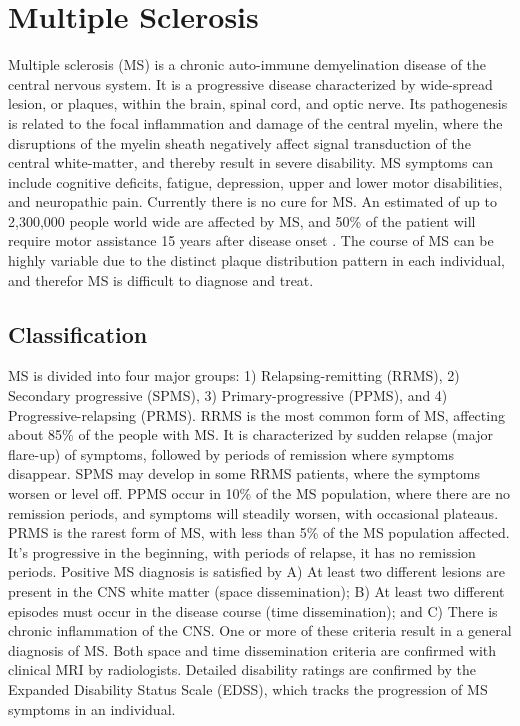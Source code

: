 \section{Multiple Sclerosis}

Multiple sclerosis (MS) is a chronic auto-immune demyelination disease of the central nervous system. It is a progressive disease characterized by wide-spread lesion, or plaques, within the brain, spinal cord, and optic nerve. Its pathogenesis is related to the focal inflammation and damage of the central myelin, where the disruptions of the myelin sheath negatively affect signal transduction of the central white-matter, and thereby result in severe disability. MS symptoms can include cognitive deficits, fatigue, depression, upper and lower motor disabilities, and neuropathic pain. Currently there is no cure for MS. 
An estimated of up to 2,300,000 people world wide are affected by MS, and 50\% of the patient will require motor assistance 15 years after disease onset \cite{Goldenberg2012}. The course of MS can be highly variable due to the distinct plaque distribution pattern in each individual, and therefor MS is difficult to diagnose and treat. 

\subsection{Classification}

MS is divided into four major groups: 1) Relapsing-remitting (RRMS), 2) Secondary progressive (SPMS), 3) Primary-progressive (PPMS), and 4) Progressive-relapsing (PRMS). RRMS is the most common form of MS, affecting about 85\% of the people with MS. It is characterized by sudden relapse (major flare-up) of symptoms, followed by periods of remission where symptoms disappear. SPMS may develop in some RRMS patients, where the symptoms worsen or level off. PPMS occur in 10\% of the MS population, where there are no remission periods, and symptoms will steadily worsen, with occasional plateaus. PRMS is the rarest form of MS, with less than 5\% of the MS population affected. It’s progressive in the beginning, with periods of relapse, it has no remission periods. 
Positive MS diagnosis is satisfied by A) At least two different lesions are present in the CNS white matter (space dissemination); B) At least two different episodes must occur in the disease course (time dissemination); and C) There is chronic inflammation of the CNS. One or more of these criteria result in a general diagnosis of MS. Both space and time dissemination criteria are confirmed with clinical MRI by radiologists. Detailed disability ratings are confirmed by the Expanded Disability Status Scale (EDSS)\cite{Kurtzke1983}, which tracks the progression of MS symptoms in an individual. 

